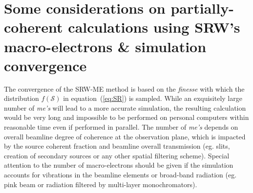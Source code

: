\documentclass{iucr}              %
\begin{document}

\section{Some considerations on partially-coherent calculations using SRW's macro-electrons \& simulation convergence}
\label{appendix:srw}

The convergence of the SRW-ME method is based on the \textit{finesse} with which the distribution $f(\mathcal{S})$ in equation~(\ref{eq:SR}) is sampled. While an exquisitely large number of \textit{me's} will lead to a more accurate simulation, the resulting calculation would be very long and impossible to be performed on personal computers within reasonable time even if performed in parallel. The number of \textit{me's} depends on overall beamline degree of coherence at the observation plane, which is impacted by the source coherent fraction and beamline overall transmission (eg. slits, creation of secondary sources or any other spatial filtering scheme). Special attention to the number of macro-electrons should be given if the simulation accounts for vibrations in the beamline elements or broad-band radiation (eg. pink beam or radiation filtered by multi-layer monochromators).
\end{document}
